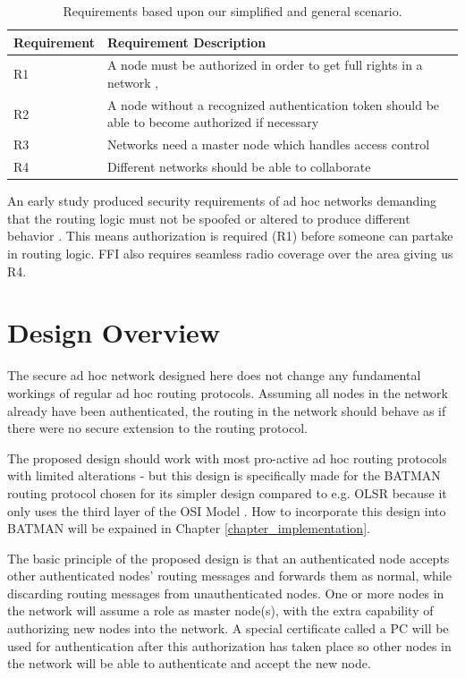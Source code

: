 \begin{table}[ht!]
	\centering
	\begin{tabular}{ | l | p{11cm} | }
	\hline
	\textbf{Requirement} & \textbf{Requirement Description}\\\hline
		R1 & A node must be authorized in order to get full rights in a
		network \cite{dahill2001secure}, \cite{sanzgiri2002secure}\\\hline
		R2 & A node without a recognized authentication token should be able to become
		authorized if necessary\\ \hline
		R3 & Networks need a master node which handles access control\\\hline
		R4 & Different networks should be able to collaborate
		\cite{ffi_2005_04015}\\\hline
	\end{tabular}
	\caption{Requirements based upon our simplified and general scenario.}
	\label{tab:our_req}
\end{table}

An early study produced security requirements of ad hoc networks demanding
that the routing logic must not be spoofed or altered to produce different
behavior \cite{dahill2001secure}. This means authorization is required (R1)
before someone can partake in routing logic. FFI also requires seamless radio coverage over the
area giving us R4.

\section{Design Overview}
The secure ad hoc network designed here does not change any fundamental workings
of regular ad hoc routing protocols. Assuming all nodes in the network already
have been authenticated, the routing in the network should behave as if there
were no secure extension to the routing protocol.

The proposed design should work with most pro-active ad hoc routing protocols
with limited alterations - but this design is specifically made for the
BATMAN \cite{batman_rfc} routing protocol chosen for its simpler design compared to
e.g. OLSR \cite{clausen2003rfc3626} because it only uses the third layer of the
OSI Model \cite{zimmermann1980osi}. How to incorporate this design into BATMAN will be
expained in Chapter \ref{chapter_implementation}.

The basic principle of the proposed design is that an authenticated node accepts
other authenticated nodes' routing messages and forwards them as normal, while
discarding routing messages from unauthenticated nodes. One or more nodes in the
network will assume a role as master node(s), with the extra capability of
authorizing new nodes into the network. A special certificate called a \ac{PC}
\cite{tuecke2004rfc3820} will be used for authentication after this authorization has taken
place so other nodes in the network will be able to authenticate and accept the new
node.


